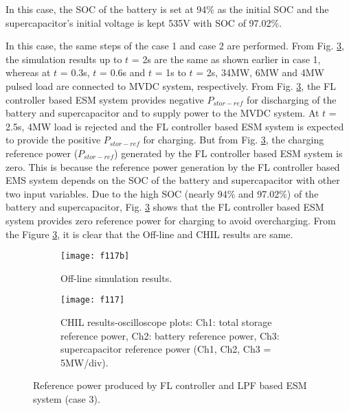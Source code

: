 In this case, the SOC of the battery is set at 94\% as the initial SOC and the supercapacitor’s initial voltage is kept 535V with SOC of 97.02\%.

In this case, the same steps of the case 1 and case 2 are performed. From Fig. \ref{ch5_f117}, the simulation results up to $t$ = 2s  are the same as shown earlier in case 1, whereas at $t$ = 0.3s, $t$ = 0.6s and $t$ = 1s to $t$ = 2s,  34MW, 6MW and 4MW pulsed load are connected to MVDC system, respectively. From Fig. \ref{ch5_f117}, the FL controller based ESM system provides negative $P_{stor-ref}$ for discharging of the battery and supercapacitor and to supply power to the MVDC system. At $t$ = 2.5s, 4MW load is rejected and the FL controller based ESM system is expected to provide the positive $P_{stor-ref}$ for charging. But from Fig. \ref{ch5_f117}, the charging reference power ($P_{stor-ref}$) generated by the FL controller based ESM system is zero. This is because the reference power generation by the FL controller based EMS system depends on the SOC of the battery and supercapacitor with other two input variables. Due to the high SOC (nearly 94\% and 97.02\%) of the battery and supercapacitor, Fig. \ref{ch5_f117} shows that the FL controller based ESM system provides zero reference power for charging to avoid overcharging. From the Figure \ref{ch5_f117}, it is clear that the Off-line and CHIL results are same. 
  
\begin{figure}[ht!]
\begin{subfigure}{1\columnwidth}
\begin{center}
\texttt{[image: f117b]}
\end{center}
\caption{Off-line simulation results.}
\label{ch5_f117b}
\end{subfigure}
\begin{subfigure}{1\columnwidth}
\begin{center}
\texttt{[image: f117]}
\end{center}
\caption{CHIL results-oscilloscope plots: Ch1: total storage reference power, Ch2: battery reference power, Ch3: supercapacitor reference  power (Ch1, Ch2, Ch3 = 5MW/div).}
\label{ch5_f117a}
\end{subfigure}
\caption{Reference power produced by FL controller and LPF based ESM system (case 3).}
\label{ch5_f117}
\end{figure}



